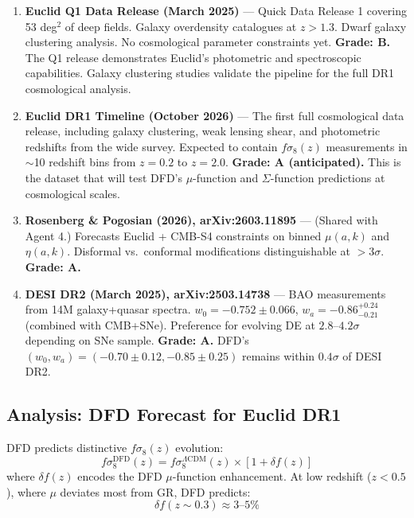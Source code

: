 \documentclass[11pt,a4paper]{article}
\begin{document}
\begin{enumerate}

\item \textbf{Euclid Q1 Data Release (March 2025)} --- Quick Data Release 1 covering 53 deg$^2$ of deep fields. Galaxy overdensity catalogues at $z > 1.3$. Dwarf galaxy clustering analysis. No cosmological parameter constraints yet. \textbf{Grade: B.} The Q1 release demonstrates Euclid's photometric and spectroscopic capabilities. Galaxy clustering studies validate the pipeline for the full DR1 cosmological analysis.

\item \textbf{Euclid DR1 Timeline (October 2026)} --- The first full cosmological data release, including galaxy clustering, weak lensing shear, and photometric redshifts from the wide survey. Expected to contain $f\sigma_8(z)$ measurements in $\sim$10 redshift bins from $z = 0.2$ to $z = 2.0$. \textbf{Grade: A (anticipated).} This is the dataset that will test DFD's $\mu$-function and $\Sigma$-function predictions at cosmological scales.

\item \textbf{Rosenberg \& Pogosian (2026), arXiv:2603.11895} --- (Shared with Agent 4.) Forecasts Euclid + CMB-S4 constraints on binned $\mu(a,k)$ and $\eta(a,k)$. Disformal vs.\ conformal modifications distinguishable at $>3\sigma$. \textbf{Grade: A.}

\item \textbf{DESI DR2 (March 2025), arXiv:2503.14738} --- BAO measurements from 14M galaxy+quasar spectra. $w_0 = -0.752 \pm 0.066$, $w_a = -0.86^{+0.24}_{-0.21}$ (combined with CMB+SNe). Preference for evolving DE at $2.8$--$4.2\sigma$ depending on SNe sample. \textbf{Grade: A.} DFD's $(w_0, w_a) = (-0.70 \pm 0.12, -0.85 \pm 0.25)$ remains within $0.4\sigma$ of DESI DR2.

\end{enumerate}

\subsection{Analysis: DFD Forecast for Euclid DR1}

DFD predicts distinctive $f\sigma_8(z)$ evolution:
\begin{equation}
f\sigma_8^\mathrm{DFD}(z) = f\sigma_8^{\Lambda\mathrm{CDM}}(z) \times \left[1 + \delta f(z)\right]
\end{equation}
where $\delta f(z)$ encodes the DFD $\mu$-function enhancement. At low redshift ($z < 0.5$), where $\mu$ deviates most from GR, DFD predicts:
\begin{equation}
\delta f(z \sim 0.3) \approx 3\text{--}5\%
\end{equation}
\end{document}
